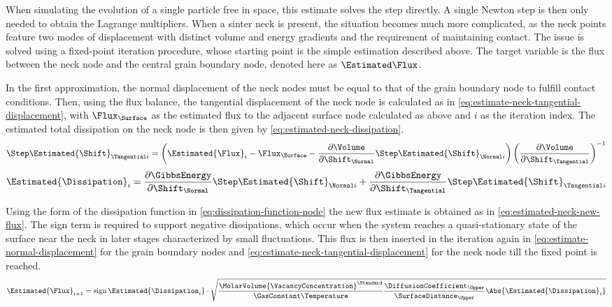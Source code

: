 When simulating the evolution of a single particle free in space, this estimate solves the step directly.
A single Newton step is then only needed to obtain the Lagrange multipliers.
When a sinter neck is present, the situation becomes much more complicated, as the neck points feature two modes of displacement with distinct volume and energy gradients and the requirement of maintaining contact.
The issue is solved using a fixed-point iteration procedure, whose starting point is the simple estimation described above.
The target variable is the flux between the neck node and the central grain boundary node, denoted here as $\Estimated\Flux$.

In the first approximation, the normal displacement of the neck nodes must be equal to that of the grain boundary node to fulfill contact conditions.
Then, using the flux balance, the tangential displacement of the neck node is calculated as in \cref{eq:estimate-neck-tangential-displacement},
with $\Flux_{\Surface}$ as the estimated flux to the adjacent surface node calculated as above and $i$ as the iteration index.
The estimated total dissipation on the neck node is then given by \cref{eq:estimated-neck-dissipation}.
\begin{equation}
    \Step\Estimated{\Shift}_{\Tangential i} =
    \left( \Estimated{\Flux}_i - \Flux_{\Surface} - \frac{\partial\Volume}{\partial\Shift_{\Normal}} \Step\Estimated{\Shift}_{\Normal i} \right)
    \left( \frac{\partial\Volume}{\partial\Shift_{\Tangential}} \right)^{-1}
    \label{eq:estimate-neck-tangential-displacement}
\end{equation}
\begin{equation}
    \Estimated{\Dissipation}_i
    = \frac{\partial\GibbsEnergy}{\partial\Shift_{\Normal}} \Step\Estimated{\Shift}_{\Normal i}
    + \frac{\partial\GibbsEnergy}{\partial\Shift_{\Tangential}} \Step\Estimated{\Shift}_{\Tangential i}
    \label{eq:estimated-neck-dissipation}
\end{equation}

Using the form of the dissipation function in \cref{eq:dissipation-function-node} the new flux estimate is obtained as in \cref{eq:estimated-neck-new-flux}.
The sign term is required to support negative dissipations, which occur when the system reaches a quasi-stationary state of the surface near the neck in later stages characterized by small fluctuations.
This flux is then inserted in the iteration again in \cref{eq:estimate-normal-displacement} for the grain boundary nodes and \cref{eq:estimate-neck-tangential-displacement} for the neck node till the fixed point is reached.
\begin{equation}
    \Estimated{\Flux}_{i+1} =
    \sign \Estimated{\Dissipation_i} \cdot
    \sqrt{
        \frac{\MolarVolume{\VacancyConcentration}^\Standard}{\GasConstant\Temperature}
        \frac{\DiffusionCoefficient_{\Upper}}{\SurfaceDistance_{\Upper}}
        \Abs{\Estimated{\Dissipation}_i}
    }
    \label{eq:estimated-neck-new-flux}
\end{equation}
